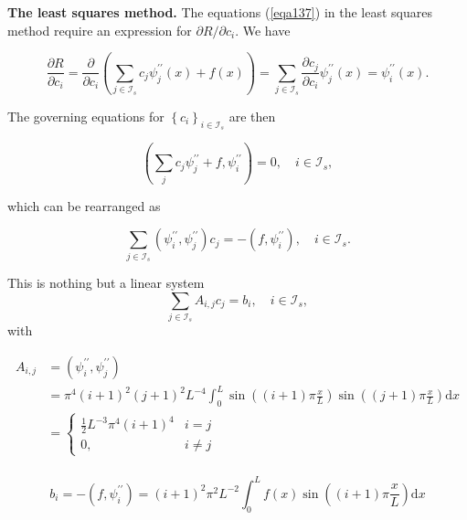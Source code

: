 \documentclass[../main.tex]{subfiles}
\begin{document}
	\noindent \textbf{The least squares method.   } The equations (\ref{eqa137}) in the least squares method require an expression for $\partial R / \partial c_{i}$. We have
	
	\begin{equation}
		\label{eqa150}
		\frac{\partial R}{\partial c_{i}}=\frac{\partial}{\partial c_{i}}\left(\sum_{j \in 	\mathcal{I}_{s}} c_{j} \psi_{j}^{\prime \prime}(x)+f(x)\right)=\sum_{j \in \mathcal{I}_{s}} \frac{\partial c_{j}}{\partial c_{i}} \psi_{j}^{\prime \prime}(x)=\psi_{i}^{\prime \prime}(x) .
	\end{equation}

	\noindent The governing equations for $\left\{c_{i}\right\}_{i \in \mathcal{I}_{s}}$ are then
	
	\begin{equation}
		\label{eqa151}
		\left(\sum_{j} c_{j} \psi_{j}^{\prime \prime}+f, \psi_{i}^{\prime \prime}\right)=0, \quad i \in \mathcal{I}_{s},
	\end{equation}
	
	\noindent which can be rearranged as
	
	\begin{equation}
		\label{eqa152}
		\sum_{j \in \mathcal{I}_{s}}\left(\psi_{i}^{\prime \prime}, \psi_{j}^{\prime \prime}\right) 	c_{j}=-\left(f, \psi_{i}^{\prime \prime}\right), \quad i \in \mathcal{I}_{s} .
	\end{equation}

	\noindent This is nothing but a linear system
	$$\sum_{j \in \mathcal{I}_{s}} A_{i, j} c_{j}=b_{i}, \quad i \in \mathcal{I}_{s},$$
	with
	
	\begin{equation}
		\label{eqa153}
		\begin{aligned}
			A_{i, j} &=\left(\psi_{i}^{\prime \prime}, \psi_{j}^{\prime \prime}\right) \\
			&=\pi^{4}(i+1)^{2}(j+1)^{2} L^{-4} \int_{0}^{L} \sin \left((i+1) \pi \frac{x}{L}\right) \sin \left((j+1) \pi \frac{x}{L}\right) \mathrm{d} x \\
			&= \begin{cases}\frac{1}{2} L^{-3} \pi^{4}(i+1)^{4} & i=j \\
				0, & i \neq j\end{cases} \\
		\end{aligned}
	\end{equation}

	\begin{equation}
		\label{eqa154}
		b_{i} =-\left(f, \psi_{i}^{\prime \prime}\right)=(i+1)^{2} \pi^{2} L^{-2} \int_{0}^{L} f(x) \sin \left((i+1) \pi \frac{x}{L}\right) \mathrm{d} x
	\end{equation}
\end{document}
